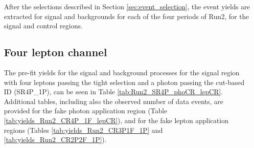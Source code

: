 \label{sec:yields}
After the selections described in Section \ref{sec:event_selection}, the event yields are extracted for signal and backgrounds for each of the four periods of Run2, for the signal and control regions.

\subsection{Four lepton channel}
The pre-fit yields for the signal and background processes for the signal region
with four leptons passing the tight selection and a photon passing the cut-based ID (SR4P\_1P),
can be seen in Table \ref{tab:Run2_SR4P_phoCR_lepCR}.
Additional tables, including also the observed number of data events, are provided
for the fake photon application region (Table \ref{tab:yields_Run2_CR4P_1F_lepCR}),
and for the fake lepton application regions (Tables \ref{tab:yields_Run2_CR3P1F_1P} and \ref{tab:yields_Run2_CR2P2F_1P}).

